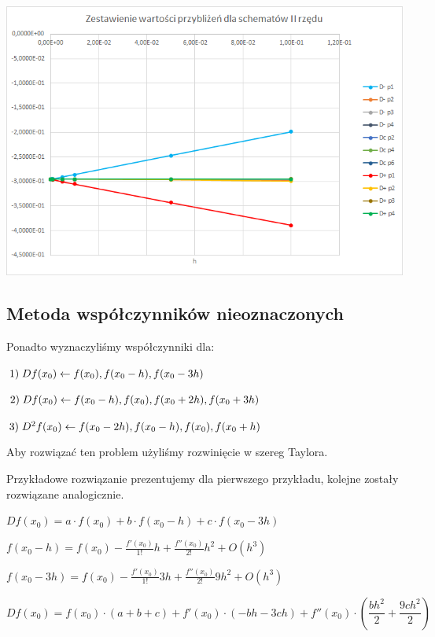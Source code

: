 \includegraphics{Lab2/charts/rz2_e.png}

\subsection{Metoda współczynników nieoznaczonych}
Ponadto wyznaczyliśmy współczynniki dla:

$1)\hspace{1mm}Df(x_{0}) \leftarrow f(x_{0}), f(x_{0}-h), f(x_{0}-3h) $

$2)\hspace{1mm}Df(x_{0}) \leftarrow f(x_{0}-h), f(x_{0}), f(x_{0}+2h), f(x_{0}+3h) $

$3)\hspace{1mm}D^2f(x_{0}) \leftarrow f(x_{0}-2h), f(x_{0}-h), f(x_{0}), f(x_{0}+h) $
\vspace{0.3cm}

Aby rozwiązać ten problem użyliśmy rozwinięcie w szereg Taylora.

Przykładowe rozwiązanie prezentujemy dla pierwszego przykładu, kolejne zostały rozwiązane analogicznie.

\vspace{0,5cm}

$Df(x_{0}) = a \cdot f(x_{0}) + b \cdot f(x_{0}-h) + c \cdot f(x_{0}-3h) $

$f(x_{0}-h) = f(x_{0}) - \frac{f'(x_{0})}{1!}h + \frac{f''(x_{0})}{2!}h^2 + O(h^3)$

$f(x_{0}-3h) = f(x_{0}) - \frac{f'(x_{0})}{1!}3h + \frac{f''(x_{0})}{2!}9h^2 + O(h^3)$

$Df(x_{0}) = f(x_{0}) \cdot (a+b+c) + f'(x_{0}) \cdot (-bh-3ch) + f''(x_{0}) \cdot (\dfrac{bh^2}{2} + \dfrac{9ch^2}{2}) $

